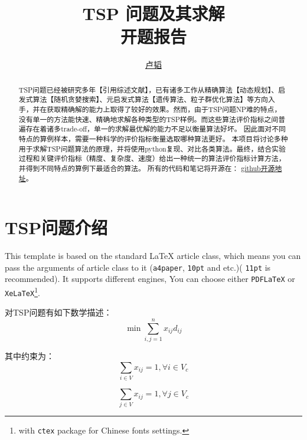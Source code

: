\documentclass[11pt]{elegantpaper}
\title{TSP 问题及其求解\\ {\small 开题报告}}
\author{\href{https://github.com/LT1st/System_engineering_programm/tree/master}{ 卢韬 }}
\institute{\href{https://github.com/ElegantLaTeX}{自动化1903班 20194127}}
\begin{document}
\maketitle

\begin{abstract}
\noindent 
\qquad TSP问题已经被研究多年【引用综述文献】，已有诸多工作从精确算法【动态规划】、启发式算法【随机贪婪搜索】、元启发式算法【遗传算法、粒子群优化算法】等方向入手，并在获取精确解的能力上取得了较好的效果。然而，由于TSP问题NP难的特点，没有单一的方法能快速、精确地求解各种类型的TSP样例。而这些算法评价指标之间普遍存在着诸多trade-off，单一的求解最优解的能力不足以衡量算法好坏。
因此面对不同特点的算例样本，需要一种科学的评价指标衡量选取哪种算法更好。
本项目将讨论多种用于求解TSP问题算法的原理，并将使用python复现、对比各类算法。最终，结合实验过程和关键评价指标（精度、复杂度、速度）给出一种统一的算法评价指标计算方法，并得到不同特点的算例下最适合的算法。
所有的代码和笔记将开源在：
\href{https://github.com/LT1st/System_engineering_programm/tree/master}{github开源地址}。\par
{}
\end{abstract}

\newpage
\tableofcontents
\newpage

\section{TSP问题介绍}

This template is based on the standard \LaTeX{} article class, which means you can pass the arguments of article class to it (\lstinline{a4paper}, \lstinline{10pt} and etc.)( \lstinline{11pt} is recommended). It supports different engines, You can choose either \lstinline{PDFLaTeX} or \lstinline{XeLaTeX}\footnote{with \lstinline{ctex} package for Chinese fonts settings.}. 

对TSP问题有如下数学描述：
\begin{equation}
\min \sum_{i,j=1}^{n} x_{ij} d_{ij} \label{eq:binom}
\end{equation}

其中约束为：
\begin{equation}
\sum_{i\in V} x_{i j}=1 , \forall i \in V_{c}
\label{eq:binom}
\end{equation}

\begin{equation}
\sum_{j\in V} x_{i j}=1 , \forall j \in V_{c}
\label{eq:binom}
\end{equation}
\end{document}
